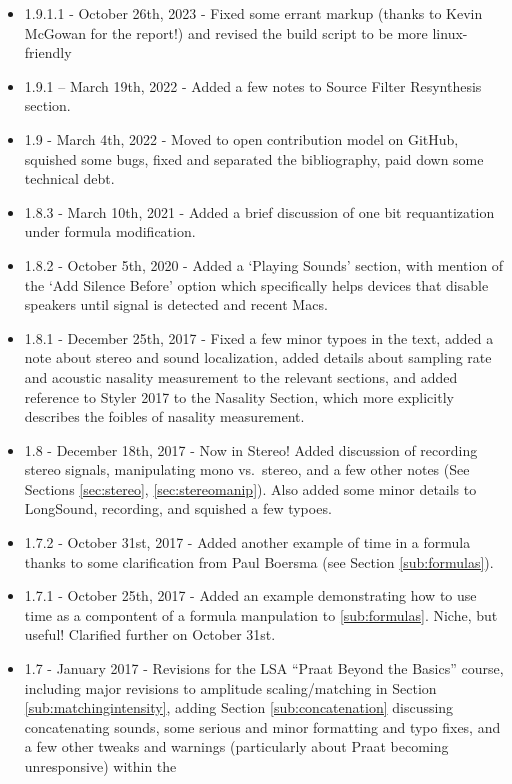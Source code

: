 \begin{itemize}
\item
  1.9.1.1 - October 26th, 2023 - Fixed some errant markup (thanks to
  Kevin McGowan for the report!) and revised the build script to be more
  linux-friendly
\item
  1.9.1 -- March 19th, 2022 - Added a few notes to Source Filter
  Resynthesis section.
\item
  1.9 - March 4th, 2022 - Moved to open contribution model on GitHub,
  squished some bugs, fixed and separated the bibliography, paid down
  some technical debt.
\item
  1.8.3 - March 10th, 2021 - Added a brief discussion of one bit
  requantization under formula modification.
\item
  1.8.2 - October 5th, 2020 - Added a `Playing Sounds' section, with
  mention of the `Add Silence Before' option which specifically helps
  devices that disable speakers until signal is detected and recent
  Macs.
\item
  1.8.1 - December 25th, 2017 - Fixed a few minor typoes in the text,
  added a note about stereo and sound localization, added details about
  sampling rate and acoustic nasality measurement to the relevant
  sections, and added reference to Styler 2017 to the Nasality Section,
  which more explicitly describes the foibles of nasality measurement.
\item
  1.8 - December 18th, 2017 - Now in Stereo! Added discussion of
  recording stereo signals, manipulating mono vs.~stereo, and a few
  other notes (See Sections \ref{sec:stereo}, \ref{sec:stereomanip}).
  Also added some minor details to LongSound, recording, and squished a
  few typoes.
\item
  1.7.2 - October 31st, 2017 - Added another example of time in a
  formula thanks to some clarification from Paul Boersma (see Section
  \ref{sub:formulas}).
\item
  1.7.1 - October 25th, 2017 - Added an example demonstrating how to use
  time as a compontent of a formula manpulation to \ref{sub:formulas}.
  Niche, but useful! Clarified further on October 31st.
\item
  1.7 - January 2017 - Revisions for the LSA ``Praat Beyond the Basics''
  course, including major revisions to amplitude scaling/matching in
  Section \ref{sub:matchingintensity}, adding Section
  \ref{sub:concatenation} discussing concatenating sounds, some serious
  and minor formatting and typo fixes, and a few other tweaks and
  warnings (particularly about Praat becoming unresponsive) within the

\end{itemize}
